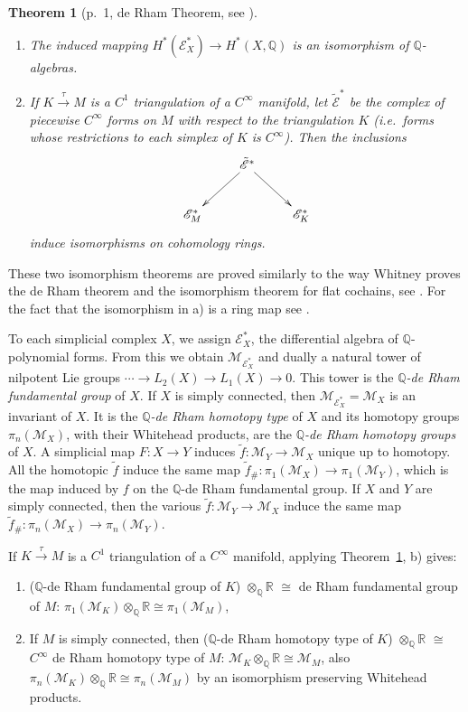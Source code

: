 \documentclass[11pt]{amsart}
\theoremstyle{plain}
\newtheorem{theorem}{Theorem}[section]
\theoremstyle{definition}
\newcommand{\sE}{\mathscr{E}}
\newcommand{\cM}{\mathcal{M}}
\newcommand{\RR}{\mathbb{R}}
\newcommand{\QQ}{\mathbb{Q}}
\begin{document}
\begin{theorem}[p.~1, de Rham Theorem, see \cite{Wh1,S3,FGM}]\label{thm:2.1}%
\begin{enumerate}
\item[(a)] The induced mapping $H^{*}(\sE^{*}_{X}) \to H^{*}(X, \QQ)$ is an isomorphism of $\QQ$-algebras.
\item[(b)] If $K \xrightarrow{\tau} M$ is a $C^{1}$ triangulation of a $C^{\infty}$ manifold, let $\tilde{\sE}^{*}$ be the complex of piecewise $C^{\infty}$ forms on $M$ with respect to the triangulation $K$ (i.e.\ forms whose restrictions to each simplex of $K$ is $C^{\infty}$). Then the inclusions
\[
\xymatrix{
& \tilde{\sE}^{*} \ar[dl] \ar[dr] & \\
\sE^{*}_{M} & & \sE^{*}_{K}
}
\]
induce isomorphisms on cohomology rings.
\end{enumerate}
\end{theorem}

These two isomorphism theorems are proved similarly to the way Whitney proves the de Rham theorem and the isomorphism theorem for flat cochains, see \cite{Wh1}. For the fact that the isomorphism in a) is a ring map see \cite{Wh3}.

To each simplicial complex $X$, we assign $\sE^{*}_{X}$, the differential algebra of $\QQ$-polynomial forms. From this we obtain $\cM_{\sE^{*}_{X}}$ and dually a natural tower of nilpotent Lie groups $\cdots \to L_{2}(X) \to L_{1}(X) \to 0$. This tower is the \emph{$\QQ$-de Rham fundamental group} of $X$. If $X$ is simply connected, then $\cM_{\sE^{*}_{X}} = \cM_{X}$ is an invariant of $X$. It is the \emph{$\QQ$-de Rham homotopy type} of $X$ and its homotopy groups $\pi_{n}(\cM_{X})$, with their Whitehead products, are the \emph{$\QQ$-de Rham homotopy groups} of $X$. A simplicial map $F \colon X \to Y$ induces $\tilde{f} \colon \cM_{Y} \to \cM_{X}$ unique up to homotopy. All the homotopic $\tilde{f}$ induce the same map $\tilde{f}_{\#} \colon \pi_{1}(\cM_{X}) \to \pi_{1}(\cM_{Y})$, which is the map induced by $f$ on the $\QQ$-de Rham fundamental group. If $X$ and $Y$ are simply connected, then the various $\tilde{f} \colon \cM_{Y} \to \cM_{X}$ induce the same map $\tilde{f}_{\#} \colon \pi_{n}(\cM_{X}) \to \pi_{n}(\cM_{Y})$.

If $K \xrightarrow{\tau} M$ is a $C^{1}$ triangulation of a $C^{\infty}$ manifold, applying Theorem~\ref{thm:2.1}, b) gives:
\begin{enumerate}
\item[1)] ($\QQ$-de Rham fundamental group of $K$) $\otimes_{\QQ} \RR$ $\cong$ de Rham fundamental group of $M$: $\pi_{1}(\cM_{K}) \otimes_{\QQ} \RR \cong \pi_{1}(\cM_{M})$,
\item[2)] If $M$ is simply connected, then ($\QQ$-de Rham homotopy type of $K$) $\otimes_{\QQ} \RR$ $\cong$ $C^{\infty}$ de Rham homotopy type of $M$: $\cM_{K} \otimes_{\QQ} \RR \cong \cM_{M}$, also $\pi_{n}(\cM_{K}) \otimes_{\QQ} \RR \cong \pi_{n}(\cM_{M})$ by an isomorphism preserving Whitehead products.
\end{enumerate}
\end{document}
